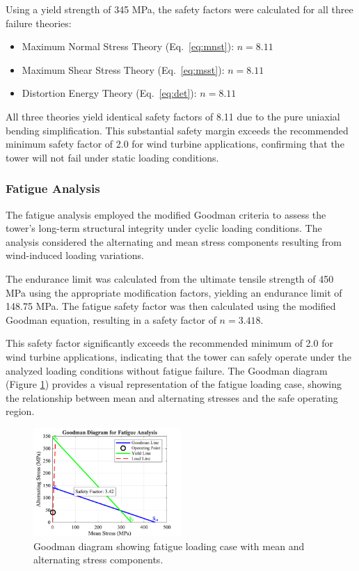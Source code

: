 \documentclass[11pt]{article}
\begin{document}
Using a yield strength of 345 MPa, the safety factors were calculated for all three failure theories:
\begin{itemize}
    \item Maximum Normal Stress Theory (Eq.~\ref{eq:mnst}): $n = 8.11$
    \item Maximum Shear Stress Theory (Eq.~\ref{eq:msst}): $n = 8.11$
    \item Distortion Energy Theory (Eq.~\ref{eq:det}): $n = 8.11$
\end{itemize}

All three theories yield identical safety factors of 8.11 due to the pure uniaxial bending simplification. This substantial safety margin exceeds the recommended minimum safety factor of 2.0 for wind turbine applications, confirming that the tower will not fail under static loading conditions. 
\subsubsection{Fatigue Analysis}

The fatigue analysis employed the modified Goodman criteria to assess the tower's long-term structural integrity under cyclic loading conditions. The analysis considered the alternating and mean stress components resulting from wind-induced loading variations.

The endurance limit was calculated from the ultimate tensile strength of 450 MPa using the appropriate modification factors, yielding an endurance limit of 148.75 MPa. The fatigue safety factor was then calculated using the modified Goodman equation, resulting in a safety factor of $n = 3.418$.

This safety factor significantly exceeds the recommended minimum of 2.0 for wind turbine applications, indicating that the tower can safely operate under the analyzed loading conditions without fatigue failure. The Goodman diagram (Figure \ref{fig:goodman}) provides a visual representation of the fatigue loading case, showing the relationship between mean and alternating stresses and the safe operating region.

\begin{figure}[H]
  \centering
  \includegraphics[width=0.5\textwidth]{media/Goodman_Diagram_Analysis.png}
  \caption{Goodman diagram showing fatigue loading case with mean and alternating stress components.}
  \label{fig:goodman}
\end{figure} 
\end{document}

